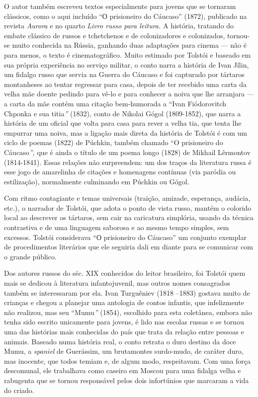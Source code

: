 O autor também escreveu textos especialmente para jovens que se tornaram
clássicos, como o aqui incluído ``О prisioneiro do Cáucaso'' (1872),
publicado na revista \emph{Aurora} e no quarto \emph{Livro russo para
leitura.} A história, tratando do embate clássico de russos e
tchetchenos e de colonizadores e colonizados, tornou-se muito conhecida
na Rússia, ganhando duas adaptações para cinema --- não é para menos, o
texto é cinematográfico\emph{.} Muito estimado por Tolstói e baseado em
sua própria experiência no serviço militar, o conto narra a história de
Ivan Jílin, um fidalgo russo que servia na Guerra do Cáucaso e foi
capturado por tártaros montanheses ao tentar regressar para casa, depois
de ter recebido uma carta da velha mãe doente pedindo para vê-lo e para
conhecer a noiva que lhe arranjara --- a carta da mãe contém uma citação
bem-humorada a ``Ivan Fiódorovitch Chponka e sua titia\emph{''}
(1832)\emph{,} conto de Nikolai Gógol (1809-1852), que narra a história
de um oficial que volta para casa para rever a velha tia, que tenta lhe
empurrar uma noiva, mas a ligação mais direta da história de Tolstói é
com um ciclo de poemas (1822) de Púchkin, também chamado ``O prisioneiro
do Cáucaso\emph{'',} que é ainda o título de um poema longo (1828) de
Mikhail Lêrmontov (1814-1841). Essas relações não surpreendem: um dos
traços da literatura russa é esse jogo de amarelinha de citações e
homenagens contínuas (via paródia ou estilização), normalmente
culminando em Púchkin ou Gógol.

Com ritmo contagiante e temas universais (traição, amizade, esperança,
audácia, etc.)\emph{,} o narrador de Tolstói, que adota o ponto de vista
russo, mantém o colorido local ao descrever os tártaros, sem cair na
caricatura simplória, usando da técnica contrastiva e de uma linguagem
saborosa e ao mesmo tempo simples, sem excessos. Tolstói considerava ``О
prisioneiro do Cáucaso'' um conjunto exemplar de procedimentos
literários que ele seguiria dali em diante para se comunicar com o
grande público.

Dos autores russos do séc. XIX conhecidos do leitor brasileiro, foi
Tolstói quem mais se dedicou à literatura infantojuvenil, mas outros
nomes consagrados também se interessaram por ela. Ivan Turguêniev (1818
--1883) gostava muito de crianças e chegou a planejar uma antologia de
contos infantis, que infelizmente não realizou, mas seu ``Mumu\emph{''}
(1854)\emph{,} escolhido para esta coletânea, embora não tenha sido
escrito unicamente para jovens, é lido nas escolas russas e se tornou
uma das histórias mais conhecidas do país que trata da relação entre
pessoas e animais. Baseado numa história real, o conto retrata o duro
destino da doce Mumu, a \emph{spaniel} de Guerássim, um brutamontes
surdo-mudo, de caráter duro, mas inocente, que todos temiam e, de algum
modo, respeitavam. Com uma força descomunal, ele trabalhava como caseiro
em Moscou para uma fidalga velha e rabugenta que se tornou responsável
pelos dois infortúnios que marcaram a vida do criado.

